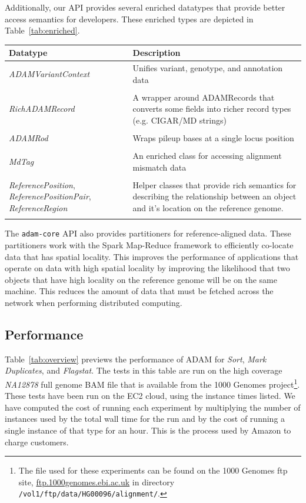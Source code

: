 \documentclass{bioinfo}
\begin{document}
Additionally, our API provides several enriched datatypes that provide better access semantics for developers. These enriched types are depicted in Table~\ref{tab:enriched}.

\begin{table}[h]
{\begin{tabular}{ p{2.5cm} p{5.5cm} }
\toprule
\bf Datatype & \bf Description \\
\midrule
\textit{ADAMVariantContext} & Unifies variant, genotype, and annotation data \\
 & \\
\textit{RichADAMRecord} & A wrapper around ADAMRecords that converts some fields into richer record types (e.g. CIGAR/MD strings) \\
 & \\
\textit{ADAMRod} & Wraps pileup bases at a single locus position \\
 & \\
\textit{MdTag} & An enriched class for accessing alignment mismatch data \\
 & \\
\textit{ReferencePosition}, \textit{ReferencePositionPair}, \textit{ReferenceRegion} & Helper classes that provide rich semantics for describing the relationship
between an object and it's location on the reference genome. \\
\botrule
\end{tabular}}{}
\end{table}

The \texttt{adam-core} API also provides partitioners for reference-aligned data. These partitioners work with the Spark Map-Reduce framework to efficiently co-locate data that
has spatial locality. This improves the performance of applications that operate on data with high spatial locality by improving the likelihood that two objects that have high
locality on the reference genome will be on the same machine. This reduces the amount of data that must be fetched across the network when performing distributed computing.

\subsection{Performance}
\label{sec:performance}

Table~\ref{tab:overview} previews the performance of ADAM for \textit{Sort}, \textit{Mark Duplicates}, and \textit{Flagstat}. The tests in this table are run on
the high coverage \textit{NA12878} full genome BAM file that is available from the 1000 Genomes project\footnote{The file used for these experiments can be found on the
1000 Genomes ftp site, \url{ftp.1000genomes.ebi.ac.uk} in directory \texttt{/vol1/ftp/data/HG00096/alignment/}.}. These tests have been run on the EC2 cloud, using the instance
times listed. We have computed the cost of running each experiment by multiplying the number of instances used by the total wall time for the run and by the cost of running
a single instance of that type for an hour. This is the process used by Amazon to charge customers.
\end{document}
